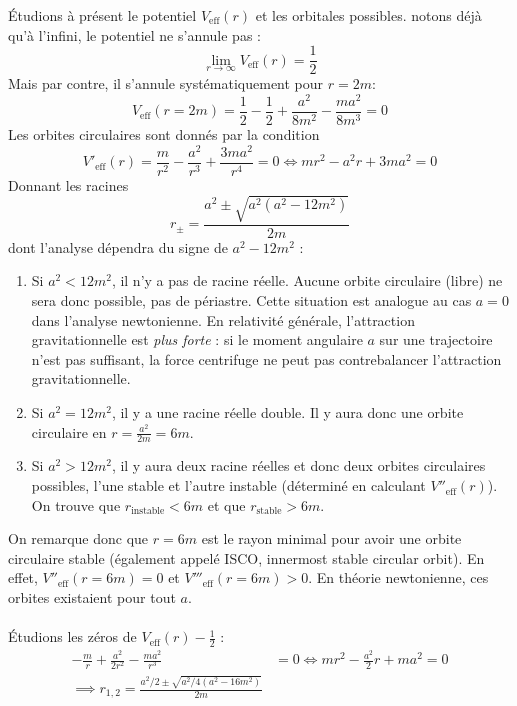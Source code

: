 Étudions à présent le potentiel $V_\text{eff} (r)$ et les orbitales possibles. notons déjà qu'à l'infini, le potentiel ne s'annule pas :
\begin{equation}
    \lim_{r\to \infty} V_\text{eff} (r) = \frac{1}{2}
\end{equation}
Mais par contre, il s'annule systématiquement pour $r = 2m$:
\begin{equation}
    V_\text{eff} (r = 2m) = \frac{1}{2} - \frac{1}{2} + \frac{a^2}{8m^2} - \frac{ma^2}{8m^3} = 0
\end{equation}
Les orbites circulaires sont donnés par la condition
\begin{equation}
    V'_\text{eff} (r) = \frac{m}{r^2} - \frac{a^2}{r^3} + \frac{3ma^2}{r^4} = 0 \iff mr^2 - a^2 r + 3ma^2 = 0
\end{equation}
Donnant les racines
\begin{equation}
    r_\pm = \frac{a^2 \pm \sqrt{a^2(a^2-12m^2)}}{2m}
\end{equation}
dont l'analyse dépendra du signe de $a^2 - 12m^2$ :
\begin{enumerate}
    \item Si $a^2<12m^2$, il n'y a pas de racine réelle. Aucune orbite circulaire (libre) ne sera donc possible, pas de périastre. Cette situation est analogue au cas $a=0$ dans l'analyse newtonienne. En relativité générale, l'attraction gravitationnelle est \emph{plus forte} : si le moment angulaire $a$ sur une trajectoire n'est pas suffisant, la force centrifuge ne peut pas contrebalancer l'attraction gravitationnelle.
    \item Si $a^2=12m^2$, il y a une racine réelle double. Il y aura donc une orbite circulaire en $r = \frac{a^2}{2m} = 6m$.
    \item Si $a^2>12m^2$, il y aura deux racine réelles et donc deux orbites circulaires possibles, l'une stable et l'autre instable (déterminé en calculant $V''_\text{eff} (r)$). On trouve que $r_\text{instable}<6m$ et que $r_\text{stable}>6m$.
\end{enumerate}
On remarque donc que $r=6m$ est le rayon minimal pour avoir une orbite circulaire stable (également appelé ISCO, innermost stable circular orbit). En effet, $V''_\text{eff} (r=6m) =0$ et $V'''_\text{eff} (r=6m)>0$. En théorie newtonienne, ces orbites existaient pour tout $a$.\\
\\
Étudions les zéros de $V_\text{eff} (r) - \frac{1}{2}$ : 
\begin{align}
    -\frac{m}{r} +\frac{a^2}{2r^2} - \frac{ma^2}{r^3} &= 0 \iff mr^2 - \frac{a^2}{2}r +ma^2 =0\\
    \implies r_{1,2} = \frac{a^2/2 \pm \sqrt{a^2/4 (a^2 -16m^2)}}{2m}
\end{align}
